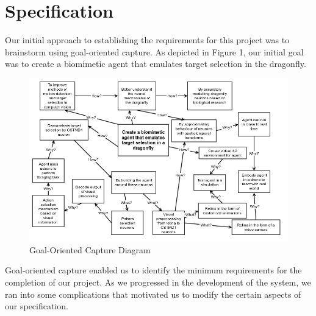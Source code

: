 \documentclass[a4paper,11pt]{article}
\begin{document}
\section{Specification}

Our initial approach to establishing the requirements for this project was to brainstorm using goal-oriented capture. As depicted in Figure 1, our initial goal was to create a biomimetic agent that emulates target selection in the dragonfly. 
	
	\begin{figure}[h]
	\begin{center}
	\includegraphics[scale = 0.5]{goalorient}
	\end{center}
	\caption{Goal-Oriented Capture Diagram}
	\end{figure}	
	
	Goal-oriented capture enabled us to identify the minimum requirements for the completion of our project. As we progressed in the development of the system, we ran into some complications that motivated us to modify the certain aspects of our specification. 
\end{document}
